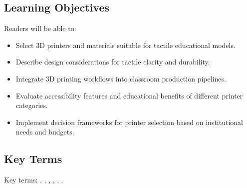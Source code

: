 \subsection{Learning Objectives}\label{chap5:learning-objectives}
Readers will be able to:
\begin{itemize}
\item Select 3D printers and materials suitable for tactile educational models.
\item Describe design considerations for tactile clarity and durability.
\item Integrate 3D printing workflows into classroom production pipelines.
\item Evaluate accessibility features and educational benefits of different printer categories.
\item Implement decision frameworks for printer selection based on institutional needs and budgets.
\end{itemize}

\subsection{Key Terms}\label{chap5:key-terms}
Key terms: , , , , , .

